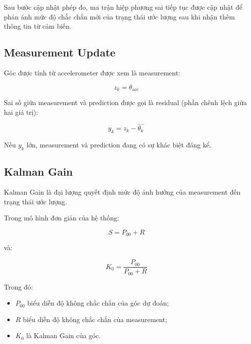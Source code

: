 \documentclass[a4paper,12pt]{report}
\begin{document}
Sau bước cập nhật phép đo, ma trận hiệp phương sai tiếp tục được cập nhật để phản ánh mức độ chắc chắn mới của trạng thái ước lượng sau khi nhận thêm thông tin từ cảm biến.


\subsection{Measurement Update}

Góc được tính từ accelerometer được xem là measurement:

\begin{equation}
z_k = \theta_{\text{acc}}
\end{equation}

Sai số giữa measurement và prediction được gọi là residual (phần chênh lệch giữa hai giá trị):

\begin{equation}
y_k
=
z_k
-
\hat{\theta}_k^{-}
\end{equation}

Nếu $y_k$ lớn, measurement và prediction đang có sự khác biệt đáng kể.


\subsection{Kalman Gain}

Kalman Gain là đại lượng quyết định mức độ ảnh hưởng của measurement đến trạng thái ước lượng.

Trong mô hình đơn giản của hệ thống:

\begin{equation}
S=P_{00}+R
\end{equation}

và:

\begin{equation}
K_0=
\frac{P_{00}}{P_{00}+R}
\end{equation}

Trong đó:

\begin{itemize}
    \item $P_{00}$ biểu diễn độ không chắc chắn của góc dự đoán;
    \item $R$ biểu diễn độ không chắc chắn của measurement;
    \item $K_0$ là Kalman Gain của góc.
\end{itemize}
\end{document}
